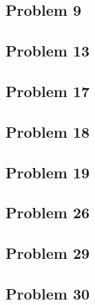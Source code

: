 \documentclass[10pt]{mypackage}
\begin{document}
\subsection{Problem 9}%
\subsection{Problem 13}%
\subsection{Problem 17}%
\subsection{Problem 18}%
\subsection{Problem 19}%
\subsection{Problem 26}%
\subsection{Problem 29}%
\subsection{Problem 30}%
\end{document}
